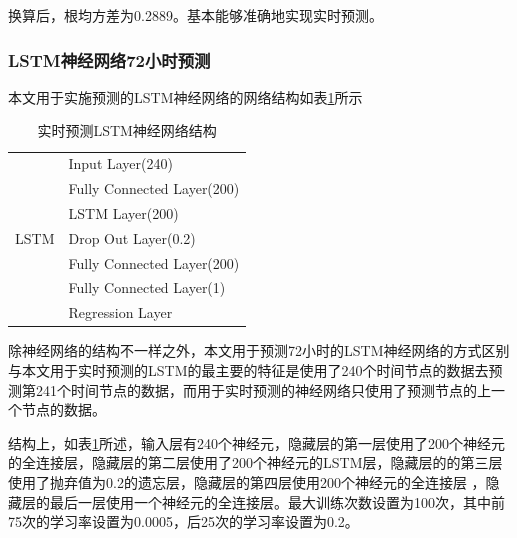 \documentclass[UTF8]{ctexart}
\begin{document}
换算后，根均方差为0.2889。基本能够准确地实现实时预测。
\subsubsection{LSTM神经网络72小时预测}
本文用于实施预测的LSTM神经网络的网络结构如表\ref{NetStruct2}所示

\begin{table}[H]
    \centering
    \begin{tabular}{|l|l|}
        \hline
        \multirow{7}{*}{LSTM} & Input Layer(240)           \\ \cline{2-2} 
                              & Fully Connected Layer(200) \\ \cline{2-2} 
                              & LSTM Layer(200)            \\ \cline{2-2} 
                              & Drop Out Layer(0.2)        \\ \cline{2-2} 
                              & Fully Connected Layer(200) \\ \cline{2-2} 
                              & Fully Connected Layer(1)   \\ \cline{2-2} 
                              & Regression Layer           \\ \hline
        \end{tabular}
    \caption{实时预测LSTM神经网络结构}
    \label{NetStruct2}
\end{table}

除神经网络的结构不一样之外，本文用于预测72小时的LSTM神经网络的方式区别与本文用于实时预测的LSTM的最主要的特征是使用了240个时间节点的数据去预测第241个时间节点的数据，而用于实时预测的神经网络只使用了预测节点的上一个节点的数据。

结构上，如表\ref{NetStruct2}所述，输入层有240个神经元，隐藏层的第一层使用了200个神经元的全连接层，隐藏层的第二层使用了200个神经元的LSTM层，隐藏层的的第三层使用了抛弃值为0.2的遗忘层，隐藏层的第四层使用200个神经元的全连接层
，隐藏层的最后一层使用一个神经元的全连接层。最大训练次数设置为100次，其中前75次的学习率设置为0.0005，后25次的学习率设置为0.2。
\end{document}
